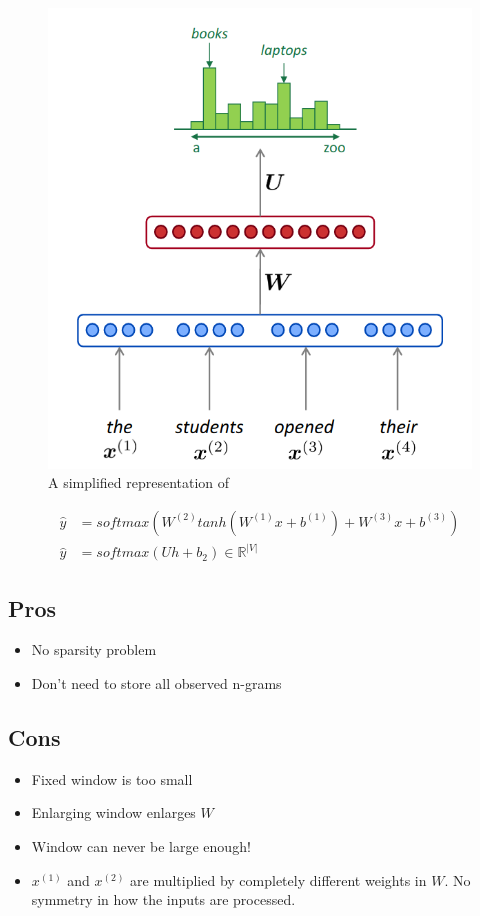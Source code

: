 \documentclass[letterpaper]{article}
\begin{document}
\begin{figure}
	\includegraphics[scale=0.5]{images/Simplified_Neural_Language_Model.png}
	\caption{A simplified representation of }
\end{figure}

\begin{align}
	\hat{y} &= softmax(W^{(2)}tanh(W^{(1)}x 
			+  b^{(1)}) + W^{(3)}x + b^{(3)}) \\
	\hat{y} &= softmax(Uh + b_2) \in \mathbb{R}^{|V|}
\end{align}


\subsection{Pros}
\begin{itemize}
	\item No sparsity problem
	\item  Don't need to store all observed n-grams
\end{itemize}

\subsection{Cons}
\begin{itemize}
	\item Fixed window is too small
	\item Enlarging window enlarges $W$
	\item Window can never be large enough!
	\item $x^{(1)}$ and $x^{(2)}$ are multiplied by completely different
	weights in $W$. No symmetry in how the inputs are processed.
\end{itemize}
\end{document}
